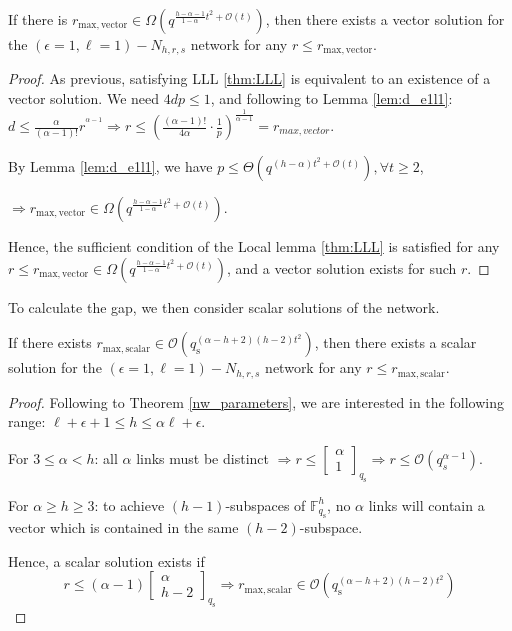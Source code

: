 \begin{thm}
If there is $r_{\mathrm{max,vector}}\in\Omega\left(q^{\frac{h-\alpha-1}{1-\alpha}t^{2}+\mathcal{O}(t)}\right)$,
then there exists a vector solution for the $\left(\epsilon=1,\ell=1\right)-\ensuremath{N}_{h,r,s}$
network for any $r\leq r_{\mathrm{max,vector}}$.
\end{thm}
\begin{proof}
As previous, satisfying LLL \ref{thm:LLL} is equivalent to an existence
of a vector solution. We need $4dp\leq1$, and following to Lemma
\ref{lem:d_e1l1}: $d\leq\frac{\alpha}{\left(\alpha-1\right)!}r^{^{\alpha-1}}\Rightarrow r\leq\left(\frac{\left(\alpha-1\right)!}{4\alpha}\cdot\frac{1}{p}\right)^{\frac{1}{\alpha-1}}=r_{max,vector}$.

By Lemma \ref{lem:d_e1l1}, we have $p\leq\Theta\left(q^{\left(h-\alpha\right)t^{2}+\mathcal{O}(t)}\right),\forall t\geq2$,

$\Rightarrow r_{\mathrm{max,vector}}\in\Omega\left(q^{\frac{h-\alpha-1}{1-\alpha}t^{2}+\mathcal{O}(t)}\right)$.

Hence, the sufficient condition of the Local lemma \ref{thm:LLL}
is satisfied for any $r\leq r_{\mathrm{max,vector}}\in\Omega\left(q^{\frac{h-\alpha-1}{1-\alpha}t^{2}+\mathcal{O}(t)}\right)$,
and a vector solution exists for such $r$.
\end{proof}
To calculate the gap, we then consider scalar solutions of the network.
\begin{thm}
If there exists $r_{\mathrm{max,scalar}}\in\mathcal{O}\left(q_{\mathrm{s}}^{\left(\alpha-h+2\right)\left(h-2\right)t^{2}}\right)$,
then there exists a scalar solution for the $\left(\epsilon=1,\ell=1\right)-\ensuremath{N}_{h,r,s}$
network for any $r\leq r_{\mathrm{max,scalar}}$.
\end{thm}
\begin{proof}
Following to Theorem \ref{nw_parameters}, we are interested in the
following range: $\ell+\epsilon+1\leq h\leq\alpha\ell+\epsilon$.

For $3\leq\alpha<h$: all $\alpha$ links must be distinct $\Rightarrow r\leq\left[\begin{array}{c}
\alpha\\
1
\end{array}\right]_{q_{\mathrm{s}}}\Rightarrow r\leq\mathcal{O}\left(q_{s}^{\alpha-1}\right)$.

For $\alpha\geq h\geq3$: to achieve $(h-1)$-subspaces of $\ensuremath{\mathbb{F}}_{q_{\mathrm{s}}}^{h}$,
no $\alpha$ links will contain a vector which is contained in the
same $(h-2)$-subspace.

Hence, a scalar solution exists if
\[
r\leq\left(\alpha-1\right)\left[\begin{array}{c}
\alpha\\
h-2
\end{array}\right]_{q_{\mathrm{s}}}\Rightarrow r_{\mathrm{max,scalar}}\in\mathcal{O}\left(q_{\mathrm{s}}^{\left(\alpha-h+2\right)\left(h-2\right)t^{2}}\right)
\]
\end{proof}
